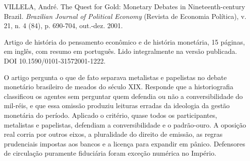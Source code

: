 
\begin{identificacao}
VILLELA, André. The Quest for Gold: Monetary Debates in Nineteenth-century
Brazil. \emph{Brazilian Journal of Political Economy} (Revista de Economia
Política), v. 21, n. 4 (84), p. 690-704, out.-dez. 2001.

Artigo de história do pensamento econômico e de história monetária, 15 páginas,
em inglês, com resumo em português. Lido integralmente na versão publicada.
DOI 10.1590/0101-31572001-1222.
\end{identificacao}

O artigo pergunta o que de fato separava metalistas e papelistas no debate
monetário brasileiro de meados do século XIX. Responde que a historiografia
classificou os agentes sem perguntar quem defendia ou não a conversibilidade do
mil-réis, e que essa omissão produziu leituras erradas da ideologia da gestão
monetária do período. Aplicado o critério, quase todos os participantes,
metalistas e papelistas, defendiam a conversibilidade e o padrão-ouro. A
oposição real corria por outros eixos, a pluralidade do direito de emissão, as
regras prudenciais impostas aos bancos e a licença para expandir em pânico.
Defensores de circulação puramente fiduciária foram exceção numérica no Império.

